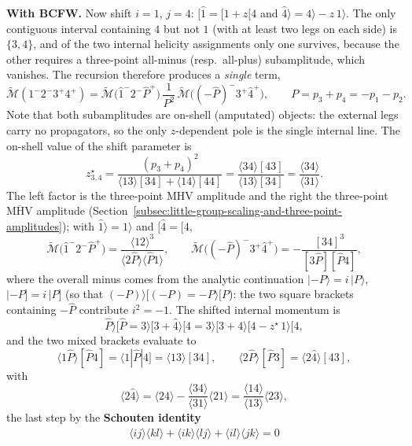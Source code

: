 \textbf{With BCFW.} Now shift $i = 1$, $j = 4$: $[\hat 1 = [1 + z [4$ and $\hat 4 \rangle = 4\rangle - z\, 1\rangle$. The only contiguous interval containing $4$ but not $1$ (with at least two legs on each side) is $\{3,4\}$, and of the two internal helicity assignments only one survives, because the other requires a three-point all-minus (resp.\ all-plus) subamplitude, which vanishes. The recursion therefore produces a \emph{single} term,
\[
	\widetilde{\mathcal{M}}(1^-2^-3^+4^+)
	= \widetilde{\mathcal{M}}\big(\hat 1^- 2^- \hat P^+\big)\, \frac{1}{P^2}\, \widetilde{\mathcal{M}}\big((-\hat P)^- 3^+ \hat 4^+\big),
	\qquad P = p_3 + p_4 = -p_1 - p_2
.\]
Note that both subamplitudes are on-shell (amputated) objects: the external legs carry no propagators, so the only $z$-dependent pole is the single internal line. The on-shell value of the shift parameter is
\[
	z^{\star}_{3,4} = \frac{(p_3 + p_4)^2}{\langle 13 \rangle [34] + \langle 14 \rangle [44]} = \frac{\langle 34 \rangle [43]}{\langle 13 \rangle [34]} = \frac{\langle 34 \rangle}{\langle 31 \rangle}
.\]
The left factor is the three-point MHV amplitude and the right the three-point $\overline{\text{MHV}}$ amplitude (Section~\ref{subsec:little-group-scaling-and-three-point-amplitudes}); with $\hat 1 \rangle = 1\rangle$ and $[\hat 4 = [4$,
\[
	\widetilde{\mathcal{M}}\big(\hat 1^- 2^- \hat P^+\big) = \frac{\langle 12 \rangle^3}{\langle 2 \hat P \rangle \langle \hat P 1 \rangle},
	\qquad
	\widetilde{\mathcal{M}}\big((-\hat P)^- 3^+ \hat 4^+\big) = -\frac{[34]^3}{[3 \hat P][\hat P 4]}
,\]
where the overall minus comes from the analytic continuation $|{-P}\rangle = i\,|P\rangle$, $|{-P}] = i\,|P]$ (so that $(-P)\rangle[(-P) = -P\rangle[P$): the two square brackets containing $-\hat P$ contribute $i^2 = -1$. The shifted internal momentum is
\[
	\hat P \rangle [ \hat P = 3\rangle[3 + \hat 4\rangle[4 = 3\rangle[3 + 4\rangle[4 - z^{\star}\, 1\rangle[4
,\]
and the two mixed brackets evaluate to
\[
	\langle 1 \hat P \rangle [\hat P 4] = \langle 1 | \hat P | 4] = \langle 13 \rangle [34],
	\qquad
	\langle 2 \hat P \rangle [\hat P 3] = \langle 2 \hat 4 \rangle [43],
\]
with
\[
	\langle 2 \hat 4 \rangle = \langle 24 \rangle - \frac{\langle 34 \rangle}{\langle 31 \rangle} \langle 21 \rangle = \frac{\langle 14 \rangle}{\langle 13 \rangle} \langle 23 \rangle
,\]
the last step by the \textbf{Schouten identity}
\begin{align}
	\label{eq:schouten}
	\langle ij \rangle \langle kl \rangle + \langle ik \rangle \langle lj \rangle + \langle il \rangle \langle jk \rangle = 0
\end{align}
